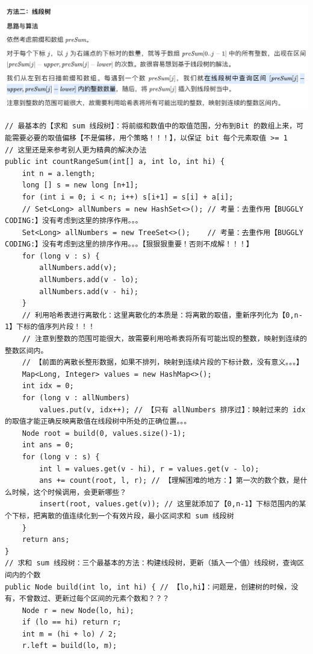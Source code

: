 \documentclass[9pt, b5paaper]{book}
\begin{document}
\begin{enumerate}
\includegraphics[width=.9\linewidth]{./pic/segmentTree_20230414_110820.png}
\begin{verbatim}
// 最基本的【求和 sum 线段树】：将前缀和数值中的取值范围，分布到Bit 的数组上来，可能需要必要的取值偏移【不是偏移，用个策略！！！】，以保证 bit 每个元素取值 >= 1
// 这里还是来参考别人更为精典的解决办法 
public int countRangeSum(int[] a, int lo, int hi) {
    int n = a.length;
    long [] s = new long [n+1];
    for (int i = 0; i < n; i++) s[i+1] = s[i] + a[i];
    // Set<Long> allNumbers = new HashSet<>(); // 考量：去重作用【BUGGLY CODING:】没有考虑到这里的排序作用。。。
    Set<Long> allNumbers = new TreeSet<>();    // 考量：去重作用【BUGGLY CODING:】没有考虑到这里的排序作用。。。【狠狠狠重要！否则不成解！！！】
    for (long v : s) {
        allNumbers.add(v);
        allNumbers.add(v - lo);
        allNumbers.add(v - hi);
    }
    // 利用哈希表进行离散化：这里离散化的本质是：将离散的取值，重新序列化为【0,n-1】下标的值序列片段！！！
    // 注意到整数的范围可能很大，故需要利用哈希表将所有可能出现的整数，映射到连续的整数区间内。
    // 【前面的离散长整形数据，如果不排列，映射到连续片段的下标计数，没有意义。。。】
    Map<Long, Integer> values = new HashMap<>();
    int idx = 0;
    for (long v : allNumbers) 
        values.put(v, idx++); // 【只有 allNumbers 排序过】：映射过来的 idx 的取值才能正确反映离散值在线段树中所处的正确位置。。。
    Node root = build(0, values.size()-1);
    int ans = 0;
    for (long v : s) {
        int l = values.get(v - hi), r = values.get(v - lo);
        ans += count(root, l, r); // 【理解困难的地方：】第一次的数个数，是什么时候，这个时候调用，会更新哪些？
        insert(root, values.get(v)); // 这里就添加了【0,n-1】下标范围内的某个下标，把离散的值连续化到一个有效片段，最小区间求和 sum 线段树
    }
    return ans;
}
// 求和 sum 线段树：三个最基本的方法：构建线段树，更新（插入一个值）线段树，查询区间内的个数
public Node build(int lo, int hi) { // 【lo,hi】：问题是，创建树的时候，没有，不曾数过、更新过每个区间的元素个数和？？？
    Node r = new Node(lo, hi);
    if (lo == hi) return r;
    int m = (hi + lo) / 2; 
    r.left = build(lo, m);

\end{verbatim}
\end{enumerate}
\end{document}
